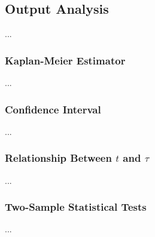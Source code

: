 \subsection{Output Analysis}


...



\subsubsection{Kaplan-Meier Estimator}



...


\subsubsection{Confidence Interval}


...


\subsubsection{Relationship Between $t$ and $\tau$}


...


\subsubsection{Two-Sample Statistical Tests}

...


